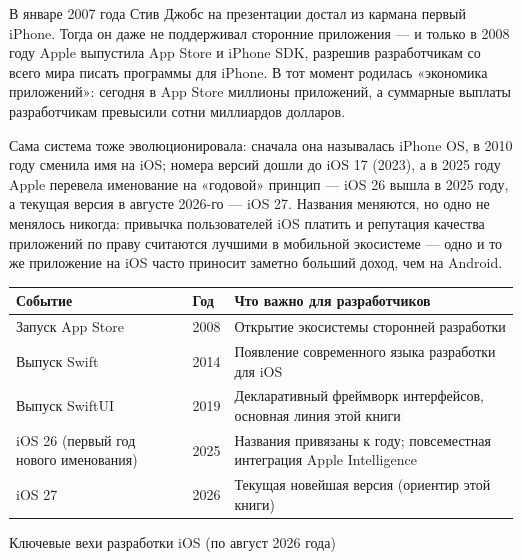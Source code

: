 


В январе 2007 года Стив Джобс на презентации достал из кармана первый iPhone. Тогда он даже не поддерживал сторонние приложения — и только в 2008 году Apple выпустила App Store и iPhone SDK, разрешив разработчикам со всего мира писать программы для iPhone. В тот момент родилась «экономика приложений»: сегодня в App Store миллионы приложений, а суммарные выплаты разработчикам превысили сотни миллиардов долларов.

Сама система тоже эволюционировала: сначала она называлась iPhone OS, в 2010 году сменила имя на iOS; номера версий дошли до iOS 17 (2023), а в 2025 году Apple перевела именование на «годовой» принцип — iOS 26 вышла в 2025 году, а текущая версия в августе 2026-го — iOS 27. Названия меняются, но одно не менялось никогда: привычка пользователей iOS платить и репутация качества приложений по праву считаются лучшими в мобильной экосистеме — одно и то же приложение на iOS часто приносит заметно больший доход, чем на Android.

\begin{center}
\begin{tabularx}{\linewidth}{|X|X|X|}
\hline
\textbf{Событие} & \textbf{Год} & \textbf{Что важно для разработчиков} \tabularnewline
\hline
Запуск App Store & 2008 & Открытие экосистемы сторонней разработки \tabularnewline
Выпуск Swift & 2014 & Появление современного языка разработки для iOS \tabularnewline
Выпуск SwiftUI & 2019 & Декларативный фреймворк интерфейсов, основная линия этой книги \tabularnewline
iOS 26 (первый год нового именования) & 2025 & Названия привязаны к году; повсеместная интеграция Apple Intelligence \tabularnewline
iOS 27 & 2026 & Текущая новейшая версия (ориентир этой книги) \tabularnewline
\hline
\end{tabularx}
\end{center}

\begin{center}\small\color{gray}Ключевые вехи разработки iOS (по август 2026 года)\end{center}

